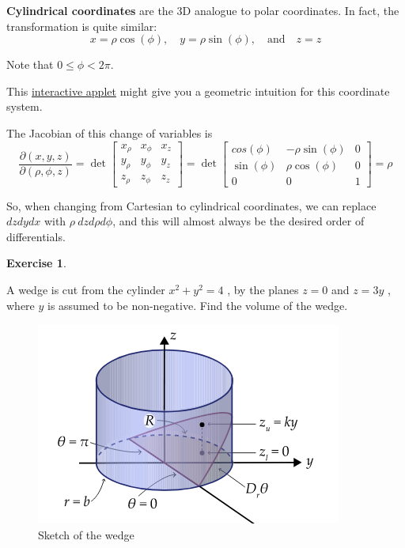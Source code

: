 \documentclass[
]{book}
\theoremstyle{definition}
\theoremstyle{definition}
\theoremstyle{definition}
\newtheorem{exercise}{Exercise}[chapter]
\theoremstyle{definition}
\theoremstyle{remark}
\begin{document}
\textbf{Cylindrical coordinates} are the 3D analogue to polar coordinates. In fact, the transformation is quite similar: \[x=\rho\cos(\phi), \quad y=\rho\sin(\phi), \quad\mbox{and}\quad z=z\]

Note that \(0\leq\phi < 2\pi\).

This \href{https://www.geogebra.org/m/uvsase6h}{interactive applet} might give you a geometric intuition for this coordinate system.

The Jacobian of this change of variables is \[\frac{\partial (x,y,z)}{\partial (\rho,\phi, z)}=\det \begin{bmatrix}x_{\rho}& x_{\phi}& x_{z} \\
y_{\rho}& y_{\phi}& y_{z} \\ z_{\rho}& z_{\phi}& z_{z} \end{bmatrix}=\det \begin{bmatrix}cos(\phi)& -\rho\sin(\phi) & 0 \\ \sin(\phi) & \rho\cos(\phi) & 0 \\ 0 & 0 & 1\end{bmatrix}=\rho\]

So, when changing from Cartesian to cylindrical coordinates, we can replace \(dzdydx\) with \(\rho~dzd\rho d\phi\), and this will almost always be the desired order of differentials.

\begin{exercise}
\protect\hypertarget{exr:unlabeled-div-124}{}\label{exr:unlabeled-div-124}

A wedge is cut from the cylinder \(x^2+y^2=4\) , by the planes \(z=0\) and \(z=3y\) , where \(y\) is assumed to be non-negative. Find the volume of the wedge.

\begin{figure}

{\centering \includegraphics[width=0.75\linewidth]{images/lec-16-ex-1} 

}

\caption{Sketch of the wedge}\label{fig:unnamed-chunk-30}
\end{figure}

\end{exercise}
\end{document}
